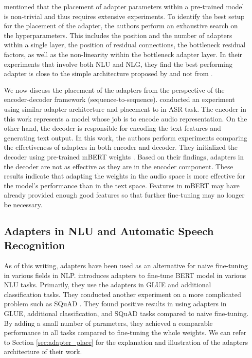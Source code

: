 \cite{pfeiffer2021adapterfusion} mentioned that the placement of adapter parameters within a pre-trained model is non-trivial and thus requires extensive experiments. To identify the best setup for the placement of the adapter, the authors perform an exhaustive search on the hyperparameters. This includes the position and the number of adapters within a single layer, the position of residual connections, the bottleneck residual factors, as well as the non-linearity within the bottleneck adapter layer. In their experiments that involve both NLU and NLG, they find the best performing adapter is close to the simple architecture proposed by \cite{bapna2019simple} and not from \cite{houlsby2019parameter}.

We now discuss the placement of the adapters from the perspective of the encoder-decoder framework (sequence-to-sequence). \cite{winata2020adapt} conducted an experiment using similar adapter architecture and placement to \cite{bapna2019simple} in ASR task. The encoder in this work represents a model whose job is to encode audio representation. On the other hand, the decoder is responsible for encoding the text features and generating text output. In this work, the authors perform experiments comparing the effectiveness of adapters in both encoder and decoder. They initialized the decoder using pre-trained mBERT weights \cite{devlin2018bert}. Based on their findings, adapters in the decoder are not as effective as they are in the encoder component. These results indicate that adapting the weights in the audio space is more effective for the model's performance than in the text space. Features in mBERT may have already provided enough good features so that further fine-tuning may no longer be necessary.

\subsection{Adapters in NLU and Automatic Speech Recognition}
\label{sec:app_nlu_asr}
As of this writing, adapters have been used as an alternative for naive fine-tuning in various fields in NLP. \cite{houlsby2019parameter} introduces adapters to fine-tune BERT model in various NLU tasks. Primarily, they use the adapters in GLUE \cite{wang2018glue} and additional classification tasks. They conducted another experiment on a more complicated problem such as SQuAD \cite{rajpurkar2018know}. They found positive results in using adapters in GLUE, additional classification, and SQuAD tasks compared to naive fine-tuning. By adding a small number of parameters, they achieved a comparable performance in all tasks compared to fine-tuning the whole weights. We can refer to Section \ref{sec:adapter_place} for the explanation and illustration of the adapters architecture of their work.

